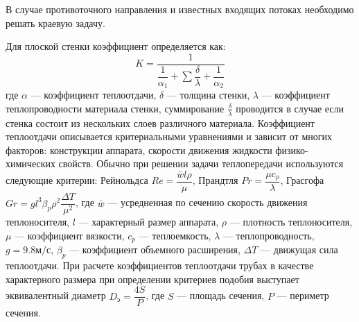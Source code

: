  В случае противоточного направления и известных входящих потоках необходимо решать краевую задачу.
 
 Для плоской стенки коэффициент определяется как:
 \begin{equation}
 	K=\dfrac{1}{\dfrac{1}{\alpha_1} + \sum \dfrac{\delta}{\lambda} + \dfrac{1}{\alpha_2}}
 \end{equation}
 где $\alpha$ --- коэффициент теплоотдачи, $\delta$ --- толщина стенки, $\lambda$ --- коэффициент теплопроводности материала стенки, суммирование $\frac{\delta}{\lambda}$ проводится в случае если стенка состоит из нескольких слоев различного материала. Коэффициент теплоотдачи описывается критериальными уравнениями и зависит от многих факторов: конструкции аппарата, скорости движения жидкости физико-химических свойств. Обычно при решении задачи теплопередачи используются следующие критерии: Рейнольдса $Re=\dfrac{\bar{w} l \rho}{\mu}$, Прандтля $Pr=\dfrac{\mu c_p}{\lambda}$, Грасгофа $ Gr= g l^3 \beta_p \rho^2 \dfrac{\Delta T}{\mu^2}$, где $\bar{w}$ --- усредненная по сечению скорость движения теплоносителя, $l$ --- характерный размер аппарата, $\rho$ --- плотность теплоносителя, $\mu$ --- коэффициент вязкости, $c_p$ --- теплоемкость,  $\lambda$ --- теплопроводность, $g=9.8 м/с$, $\beta_p$ --- коэффициент объемного расширения, $\Delta T$ --- движущая сила теплоотдачи.
  При расчете коэффициентов теплоотдачи трубах в качестве характерного размера при определении критериев подобия выступает эквивалентный диаметр $D_э=\dfrac{4S}{P}$, где $S$ --- площадь сечения, $P$ --- периметр сечения.
